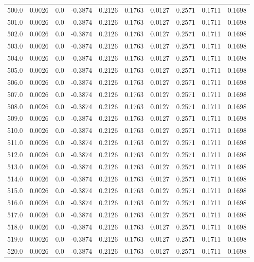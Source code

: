\begin{longtable}{lrrrrrrrrr}
500.0 & 0.0026 & 0.0 & -0.3874 & 0.2126 & 0.1763 & 0.0127 & 0.2571 & 0.1711 & 0.1698 \\
501.0 & 0.0026 & 0.0 & -0.3874 & 0.2126 & 0.1763 & 0.0127 & 0.2571 & 0.1711 & 0.1698 \\
502.0 & 0.0026 & 0.0 & -0.3874 & 0.2126 & 0.1763 & 0.0127 & 0.2571 & 0.1711 & 0.1698 \\
503.0 & 0.0026 & 0.0 & -0.3874 & 0.2126 & 0.1763 & 0.0127 & 0.2571 & 0.1711 & 0.1698 \\
504.0 & 0.0026 & 0.0 & -0.3874 & 0.2126 & 0.1763 & 0.0127 & 0.2571 & 0.1711 & 0.1698 \\
505.0 & 0.0026 & 0.0 & -0.3874 & 0.2126 & 0.1763 & 0.0127 & 0.2571 & 0.1711 & 0.1698 \\
506.0 & 0.0026 & 0.0 & -0.3874 & 0.2126 & 0.1763 & 0.0127 & 0.2571 & 0.1711 & 0.1698 \\
507.0 & 0.0026 & 0.0 & -0.3874 & 0.2126 & 0.1763 & 0.0127 & 0.2571 & 0.1711 & 0.1698 \\
508.0 & 0.0026 & 0.0 & -0.3874 & 0.2126 & 0.1763 & 0.0127 & 0.2571 & 0.1711 & 0.1698 \\
509.0 & 0.0026 & 0.0 & -0.3874 & 0.2126 & 0.1763 & 0.0127 & 0.2571 & 0.1711 & 0.1698 \\
510.0 & 0.0026 & 0.0 & -0.3874 & 0.2126 & 0.1763 & 0.0127 & 0.2571 & 0.1711 & 0.1698 \\
511.0 & 0.0026 & 0.0 & -0.3874 & 0.2126 & 0.1763 & 0.0127 & 0.2571 & 0.1711 & 0.1698 \\
512.0 & 0.0026 & 0.0 & -0.3874 & 0.2126 & 0.1763 & 0.0127 & 0.2571 & 0.1711 & 0.1698 \\
513.0 & 0.0026 & 0.0 & -0.3874 & 0.2126 & 0.1763 & 0.0127 & 0.2571 & 0.1711 & 0.1698 \\
514.0 & 0.0026 & 0.0 & -0.3874 & 0.2126 & 0.1763 & 0.0127 & 0.2571 & 0.1711 & 0.1698 \\
515.0 & 0.0026 & 0.0 & -0.3874 & 0.2126 & 0.1763 & 0.0127 & 0.2571 & 0.1711 & 0.1698 \\
516.0 & 0.0026 & 0.0 & -0.3874 & 0.2126 & 0.1763 & 0.0127 & 0.2571 & 0.1711 & 0.1698 \\
517.0 & 0.0026 & 0.0 & -0.3874 & 0.2126 & 0.1763 & 0.0127 & 0.2571 & 0.1711 & 0.1698 \\
518.0 & 0.0026 & 0.0 & -0.3874 & 0.2126 & 0.1763 & 0.0127 & 0.2571 & 0.1711 & 0.1698 \\
519.0 & 0.0026 & 0.0 & -0.3874 & 0.2126 & 0.1763 & 0.0127 & 0.2571 & 0.1711 & 0.1698 \\
520.0 & 0.0026 & 0.0 & -0.3874 & 0.2126 & 0.1763 & 0.0127 & 0.2571 & 0.1711 & 0.1698 \\

\end{longtable}
